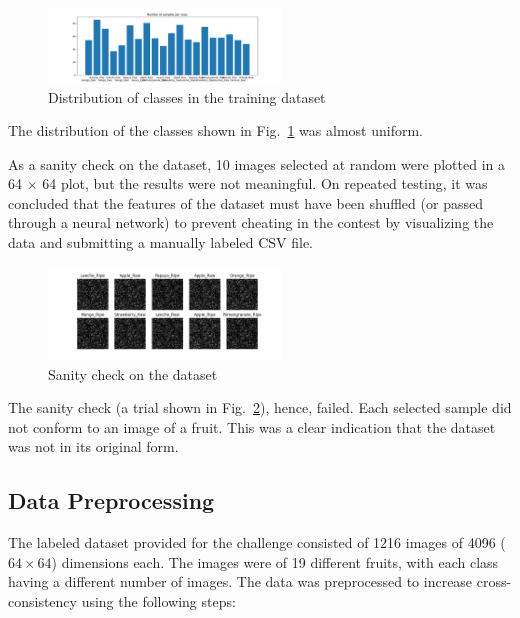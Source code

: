 \documentclass[conference]{IEEEtran}
\begin{document}
    \begin{figure}[htbp]
        \centerline{\includegraphics[width=0.55\textwidth]{Assets/distribution.png}}
        \caption{Distribution of classes in the training dataset}
        \label{fig:distribution}
    \end{figure}

    The distribution of the classes shown in Fig.~\ref{fig:distribution} was almost uniform.

    As a sanity check on the dataset, 10 images selected at random were plotted in a 64 $\times$ 64 plot, but
    the results were not meaningful.
    On repeated testing, it was concluded that the features of the dataset must have been shuffled (or passed through a neural network)
    to prevent cheating in the contest by visualizing the data and submitting a manually labeled CSV file.

    \begin{figure}[htbp]
        \centerline{\includegraphics[width=0.55\textwidth]{Assets/sanity-check.png}}
        \caption{Sanity check on the dataset}
        \label{fig:sanitycheck}
    \end{figure}

    The sanity check (a trial shown in Fig.~\ref{fig:sanitycheck}), hence, failed.
    Each selected sample did not conform to an image of a fruit.
    This was a clear indication that the dataset was not in its original form.

    \subsection{Data Preprocessing}
    \label{sec:dataprep}
    The labeled dataset provided for the challenge consisted of 1216 images of 4096 ($64 \times 64$) dimensions each.
    The images were of 19 different fruits, with each class having a different number of images.
    The data was preprocessed to increase cross-consistency using the following steps:
\end{document}
